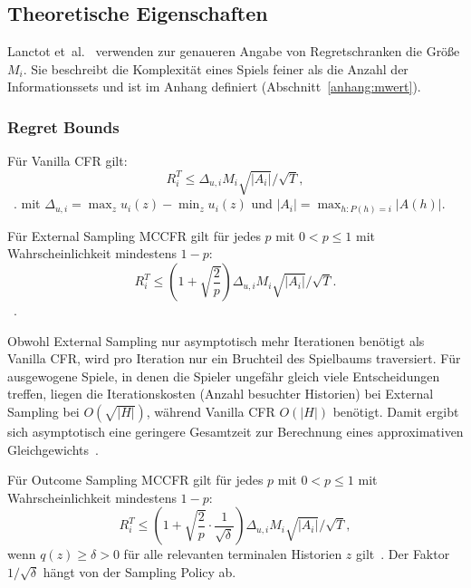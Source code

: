 \subsection{Theoretische Eigenschaften}
Lanctot et~al.~\cite{lanctot2009monte} verwenden zur genaueren Angabe von Regretschranken die Größe $M_i$.
Sie beschreibt die Komplexität eines Spiels feiner als die Anzahl der Informationssets und ist im Anhang definiert (Abschnitt~\ref{anhang:mwert}).


\subsubsection{Regret Bounds}

Für Vanilla CFR gilt:
\begin{equation}
R_i^T \le \Delta_{u,i} M_i \sqrt{|A_i|}/\sqrt{T},
\end{equation}
~\cite[Thm.~3]{lanctot2009monte}.
mit $\Delta_{u,i} = \max_z u_i(z) - \min_z u_i(z)$ und $|A_i| = \max_{h:P(h)=i} |A(h)|$.

Für External Sampling MCCFR gilt für jedes $p$ mit $0 < p \le 1$ mit Wahrscheinlichkeit mindestens $1-p$:
\begin{equation}
R_i^T \le \left(1 + \sqrt{\frac{2}{p}}\right) \Delta_{u,i} M_i \sqrt{|A_i|}/\sqrt{T}.
\end{equation}
~\cite[Thm.~4]{lanctot2009monte}.

Obwohl External Sampling nur asymptotisch mehr Iterationen benötigt als Vanilla CFR, wird pro Iteration nur ein Bruchteil des Spielbaums traversiert.
Für ausgewogene Spiele, in denen die Spieler ungefähr gleich viele Entscheidungen treffen, liegen die Iterationskosten (Anzahl besuchter Historien) bei External Sampling bei $O(\sqrt{|H|})$, während Vanilla CFR $O(|H|)$ benötigt.
Damit ergibt sich asymptotisch eine geringere Gesamtzeit zur Berechnung eines approximativen Gleichgewichts~\cite[Sec.~4]{lanctot2009monte}.

Für Outcome Sampling MCCFR gilt für jedes $p$ mit $0 < p \le 1$ mit Wahrscheinlichkeit mindestens $1-p$:
\begin{equation}
R_i^T \le \left(1 + \sqrt{\frac{2}{p}} \cdot \frac{1}{\sqrt{\delta}}\right) \Delta_{u,i} M_i \sqrt{|A_i|}/\sqrt{T},
\end{equation}
wenn $q(z) \ge \delta > 0$ für alle relevanten terminalen Historien $z$ gilt~\cite[Thm.~5]{lanctot2009monte}.
Der Faktor $1/\sqrt{\delta}$ hängt von der Sampling Policy ab.
